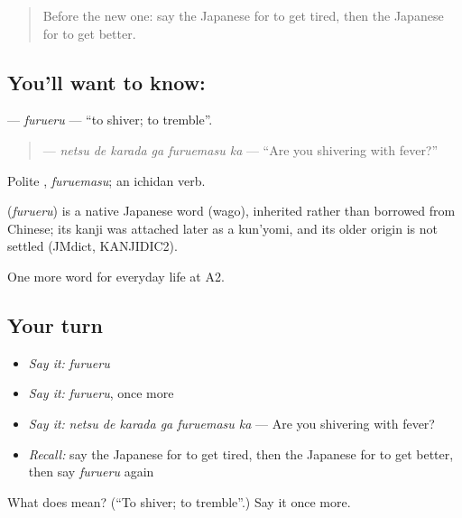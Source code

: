 \begin{quote}
Before the new one: say the Japanese for to get tired, then the Japanese for to get better.
\end{quote}

\subsection*{You'll want to know: }
\textbf{} — \emph{furueru} — \textquotedblleft{}to shiver; to tremble\textquotedblright{}.

\begin{quote}
\textbf{  } — \emph{netsu de karada ga furuemasu ka} — \textquotedblleft{}Are you shivering with fever?\textquotedblright{}
\end{quote}

Polite \textbf{}, \emph{furuemasu}; an ichidan verb.

\begin{cousinweb}
\textbf{} (\emph{furueru}) is a native Japanese word (wago), inherited rather than borrowed from Chinese; its kanji was attached later as a kun'yomi, and its older origin is not settled (JMdict, KANJIDIC2).
\end{cousinweb}

\begin{grammarlens}[title={What you've built}]
One more word for everyday life at A2.
\end{grammarlens}

\subsection*{Your turn}
\begin{itemize}
\raggedright
  \item \emph{Say it:} \emph{furueru}
  \item \emph{Say it:} \emph{furueru}, once more
  \item \emph{Say it:} \emph{netsu de karada ga furuemasu ka} — Are you shivering with fever?
  \item \emph{Recall:} say the Japanese for to get tired, then the Japanese for to get better, then say \emph{furueru} again
\end{itemize}

\begin{tcolorbox}[breakable,colback=teal!4,colframe=teal!35!black,title={Before you move on}]
What does  mean? (\textquotedblleft{}To shiver; to tremble\textquotedblright{}.) Say it once more.
\end{tcolorbox}
